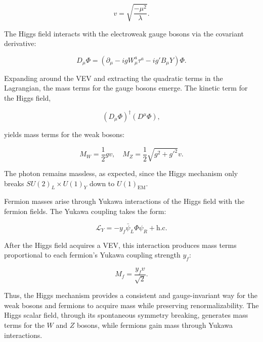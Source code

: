 \begin{equation}
\label{eq:higgspotmin}
v = \sqrt{\frac{-\mu^2}{\lambda}}.
\end{equation}

The Higgs field interacts with the electroweak gauge bosons via the covariant derivative:

\begin{equation}
\label{eq:higgscovder}
D_\mu \Phi = \left( \partial_\mu - i g W^a_\mu \tau^a - i g' B_\mu Y \right) \Phi.
\end{equation}

Expanding around the VEV and extracting the quadratic terms in the Lagrangian, the mass terms for the gauge bosons emerge. The kinetic term for the Higgs field, 

\begin{equation}
\label{eq:higgskinetic}
(D_\mu \Phi)^\dagger (D^\mu \Phi),
\end{equation}

yields mass terms for the weak bosons:

\begin{equation}
\label{eq:higgsweakmass}
M_W = \frac{1}{2} g v, \quad M_Z = \frac{1}{2} \sqrt{g^2 + g'^2} v.
\end{equation}

The photon remains massless, as expected, since the Higgs mechanism only breaks \( SU(2)_L \times U(1)_Y \) down to \( U(1)_{\text{EM}} \).

Fermion masses arise through Yukawa interactions of the Higgs field with the fermion fields. The Yukawa coupling takes the form:

\begin{equation}
\label{eq:higgsyukawa}
\mathcal{L}_Y = - y_f \bar{\psi}_L \Phi \psi_R + \text{h.c.}
\end{equation}

After the Higgs field acquires a VEV, this interaction produces mass terms proportional to each fermion's Yukawa coupling strength \( y_f \):

\begin{equation}
\label{eq:higgsfermmass}
M_f = \frac{y_f v}{\sqrt{2}}.
\end{equation}

Thus, the Higgs mechanism provides a consistent and gauge-invariant way for the weak bosons and fermions to acquire mass while preserving renormalizability. The Higgs scalar field, through its spontaneous symmetry breaking, generates mass terms for the \( W \) and \( Z \) bosons, while fermions gain mass through Yukawa interactions. 

